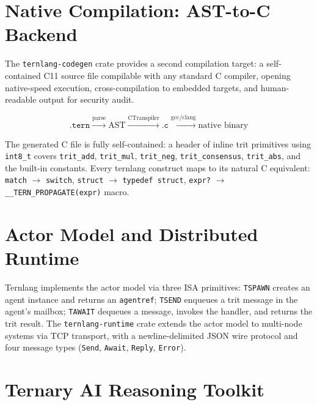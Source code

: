 \documentclass[journal,10pt,twocolumn]{IEEEtran}
\begin{document}
\section{Native Compilation: AST-to-C Backend}
\label{sec:codegen}

The \texttt{ternlang-codegen} crate provides a second compilation target: a
self-contained C11 source file compilable with any standard C compiler,
opening native-speed execution, cross-compilation to embedded targets, and
human-readable output for security audit.

\begin{equation}
  \texttt{.tern} \xrightarrow{\text{parse}} \text{AST}
  \xrightarrow{\text{CTranspiler}} \texttt{.c}
  \xrightarrow{\text{gcc/clang}} \text{native binary}
  \label{eq:ctranspile}
\end{equation}

The generated C file is fully self-contained: a header of inline trit
primitives using \texttt{int8\_t} covers \texttt{trit\_add},
\texttt{trit\_mul}, \texttt{trit\_neg}, \texttt{trit\_consensus},
\texttt{trit\_abs}, and the built-in constants. Every ternlang construct maps
to its natural C equivalent: \texttt{match} $\rightarrow$ \texttt{switch},
\texttt{struct} $\rightarrow$ \texttt{typedef struct},
\texttt{expr?} $\rightarrow$ \texttt{\_\_TERN\_PROPAGATE(expr)} macro.

\section{Actor Model and Distributed Runtime}
\label{sec:actors}

Ternlang implements the actor model via three ISA primitives:
\texttt{TSPAWN} creates an agent instance and returns an \texttt{agentref};
\texttt{TSEND} enqueues a trit message in the agent's mailbox;
\texttt{TAWAIT} dequeues a message, invokes the handler, and returns the trit
result. The \texttt{ternlang-runtime} crate extends the actor model to
multi-node systems via TCP transport, with a newline-delimited JSON wire
protocol and four message types (\texttt{Send}, \texttt{Await},
\texttt{Reply}, \texttt{Error}).

\section{Ternary AI Reasoning Toolkit}
\label{sec:reasoning}
\end{document}
